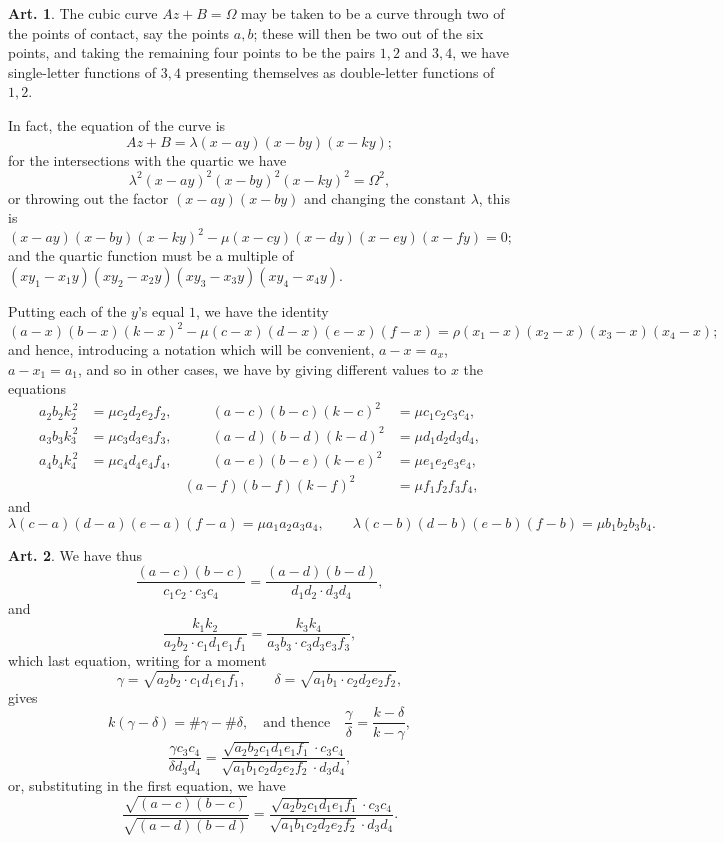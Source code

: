 \documentclass[11pt,a4paper]{article}
\theoremstyle{definition}
\newtheorem{art}{Art.}[section]
\begin{document}
\begin{art}
The cubic curve $Az + B = \Omega$ may be taken to be a curve through two of the points of contact, say the points $a,b$; these will then be two out of the six points, and taking the remaining four points to be the pairs $1,2$ and $3,4$, we have single-letter functions of $3,4$ presenting themselves as double-letter functions of $1,2$.

In fact, the equation of the curve is
\[
Az + B = \lambda (x-ay)(x-by)(x-ky);
\]
for the intersections with the quartic we have
\[
\lambda^2 (x-ay)^2 (x-by)^2 (x-ky)^2 = \Omega^2,
\]
or throwing out the factor $(x-ay)(x-by)$ and changing the constant $\lambda$, this is
\[
(x-ay)(x-by)(x-ky)^2 - \mu (x-cy)(x-dy)(x-ey)(x-fy) = 0;
\]
and the quartic function must be a multiple of $(xy_1-x_1y)(xy_2-x_2y)(xy_3-x_3y)(xy_4-x_4y)$.

Putting each of the $y$'s equal $1$, we have the identity
\[
(a-x)(b-x)(k-x)^2 - \mu(c-x)(d-x)(e-x)(f-x) = \rho(x_1-x)(x_2-x)(x_3-x)(x_4-x);
\]
and hence, introducing a notation which will be convenient, $a-x = a_x$, $a-x_1 = a_1$, and so in other cases, we have by giving different values to $x$ the equations
\[
\begin{aligned}
a_2b_2k_2^{\,2} &= \mu c_2d_2e_2f_2, &\qquad (a-c)(b-c)(k-c)^2 &= \mu c_1c_2c_3c_4, \\
a_3b_3k_3^{\,2} &= \mu c_3d_3e_3f_3, &\qquad (a-d)(b-d)(k-d)^2 &= \mu d_1d_2d_3d_4, \\
a_4b_4k_4^{\,2} &= \mu c_4d_4e_4f_4, &\qquad (a-e)(b-e)(k-e)^2 &= \mu e_1e_2e_3e_4, \\[-2pt]
& & (a-f)(b-f)(k-f)^2 &= \mu f_1f_2f_3f_4,
\end{aligned}
\]
and
\[
\lambda(c-a)(d-a)(e-a)(f-a) = \mu a_1a_2a_3a_4, \qquad
\lambda(c-b)(d-b)(e-b)(f-b) = \mu b_1b_2b_3b_4.
\]
\end{art}

\newpage
\begin{art}
We have thus
\[
\frac{(a-c)(b-c)}{c_1c_2 \cdot c_3c_4} = \frac{(a-d)(b-d)}{d_1d_2 \cdot d_3d_4},
\]
and
\[
\frac{k_1k_2}{a_2b_2 \cdot c_1d_1e_1f_1} = \frac{k_3k_4}{a_3b_3 \cdot c_3d_3e_3f_3},
\]
which last equation, writing for a moment
\[
\gamma = \sqrt{a_2b_2 \cdot c_1d_1e_1f_1}, \qquad
\delta = \sqrt{a_1b_1 \cdot c_2d_2e_2f_2},
\]
gives
\[
k(\gamma-\delta) = \#\gamma - \#\delta, \quad \text{and thence} \quad
\frac{\gamma}{\delta} = \frac{k-\delta}{k-\gamma},
\]
\[
\frac{\gamma c_3c_4}{\delta d_3d_4} = \frac{\sqrt{a_2b_2c_1d_1e_1f_1} \cdot c_3c_4}{\sqrt{a_1b_1c_2d_2e_2f_2} \cdot d_3d_4},
\]
or, substituting in the first equation, we have
\[
\frac{\sqrt{(a-c)(b-c)}}{\sqrt{(a-d)(b-d)}} = \frac{\sqrt{a_2b_2c_1d_1e_1f_1} \cdot c_3c_4}{\sqrt{a_1b_1c_2d_2e_2f_2} \cdot d_3d_4}.
\]
\end{art}
\end{document}
